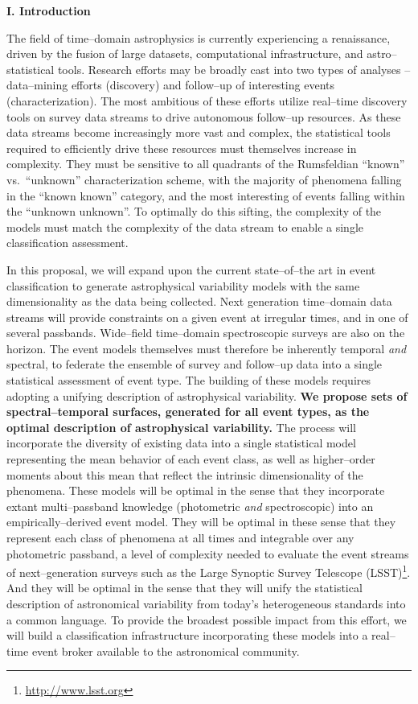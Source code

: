\centerline{\bf I. Introduction} \smallskip

The field of time--domain astrophysics is currently experiencing a renaissance,
driven by the fusion of large datasets, computational infrastructure, and
astro--statistical tools.  Research efforts may be broadly cast into two types
of analyses -- data--mining efforts (discovery) and follow--up of interesting
events (characterization).  The most ambitious of these efforts utilize
real--time discovery tools on survey data streams to drive autonomous follow--up
resources. As these data streams become increasingly more vast and complex, the
statistical tools required to efficiently drive these resources must themselves
increase in complexity.  They must be sensitive to all quadrants of the
Rumsfeldian ``known'' vs.\ ``unknown'' characterization scheme, with the
majority of phenomena falling in the ``known known'' category, and the most
interesting of events falling within the ``unknown unknown''.  To optimally do
this sifting, the complexity of the models must match the complexity of the data
stream to enable a single classification assessment.

In this proposal, we will expand upon the current state--of--the art in event
classification to generate astrophysical variability models with the same
dimensionality as the data being collected. Next generation time--domain data
streams will provide constraints on a given event at irregular times, and in one
of several passbands.  Wide--field time--domain spectroscopic surveys are also
on the horizon.  The event models themselves must therefore be inherently
temporal {\it and} spectral, to federate the ensemble of survey and follow--up
data into a single statistical assessment of event type.  The building of these
models requires adopting a unifying description of astrophysical variability.
{\bf We propose sets of spectral--temporal surfaces, generated for all event
types, as the optimal description of astrophysical variability.}  The process
will incorporate the diversity of existing data into a single statistical model
representing the mean behavior of each event class, as well as higher--order
moments about this mean that reflect the intrinsic dimensionality of the
phenomena.  These models will be optimal in the sense that they incorporate
extant multi--passband knowledge (photometric {\it and} spectroscopic) into an
empirically--derived event model. They will be optimal in these sense that they
represent each class of phenomena at all times and integrable over any
photometric passband, a level of complexity needed to evaluate the event streams
of next--generation surveys such as the Large Synoptic Survey Telescope
(LSST)\footnote{\url{http://www.lsst.org}}. And they will be optimal in the
sense that they will unify the statistical description of astronomical
variability from today's heterogeneous standards into a common language.  To
provide the broadest possible impact from this effort, we will build a
classification infrastructure incorporating these models into a real--time event
broker available to the astronomical community.


